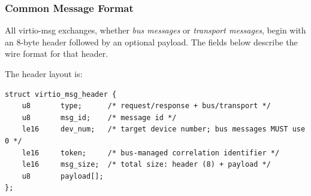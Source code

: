 \subsubsection{Common Message Format}
\label{sec:Virtio Transport Options / Virtio Over Messages / Basic Concepts / Common Message Format}

All virtio-msg exchanges, whether \emph{bus messages} or \emph{transport
messages}, begin with an 8-byte header followed by an optional payload. The
fields below describe the wire format for that header.

The header layout is:
\begin{lstlisting}
struct virtio_msg_header {
    u8       type;      /* request/response + bus/transport */
    u8       msg_id;    /* message id */
    le16     dev_num;   /* target device number; bus messages MUST use 0 */
    le16     token;     /* bus-managed correlation identifier */
    le16     msg_size;  /* total size: header (8) + payload */
    u8       payload[];
};
\end{lstlisting}

